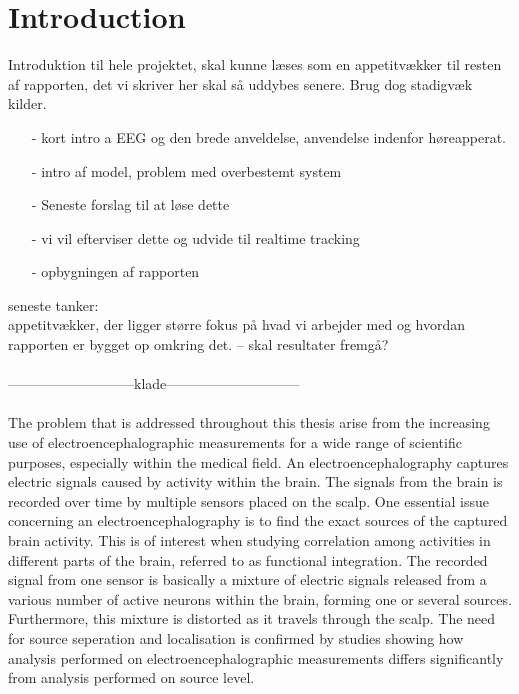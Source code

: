 \chapter*{Introduction}\label{ch:introduction}
Introduktion til hele projektet, skal kunne læses som en appetitvækker til resten af rapporten, det vi skriver her skal så uddybes senere. Brug dog stadigvæk kilder.

\begin{itemize}
\item[-] kort intro a EEG og den brede anveldelse, anvendelse indenfor høreapperat. 
\item[-] intro af model, problem med overbestemt system
\item[-] Seneste forslag til at løse dette 
\item[-] vi vil efterviser dette og udvide til realtime tracking
\item[-] opbygningen af rapporten
\end{itemize}
seneste tanker:\\
appetitvækker, der ligger større fokus på hvad vi arbejder med og hvordan rapporten er bygget op omkring det. -- skal resultater fremgå?   \\ \\

---------------------------klade-----------------------------\\ \\

The problem that is addressed throughout this thesis arise from the increasing use of electroencephalographic measurements for a wide range of scientific purposes, especially within the medical field. 
An electroencephalography captures electric signals caused by activity within the brain. The signals from the brain is recorded over time by multiple sensors placed on the scalp.
One essential issue concerning an electroencephalography is to  
find the exact sources of the captured brain activity. This is of interest when studying correlation among activities in different parts of the brain, referred to as functional integration.  
The recorded signal from one sensor is basically a mixture of electric signals released from a various number of active neurons within the brain, forming one or several sources. 
Furthermore, this mixture is distorted as it travels through the scalp. The need for source seperation and localisation is confirmed by studies showing how analysis performed on electroencephalographic measurements differs significantly from analysis performed on source level\cite{Friston2002}.


